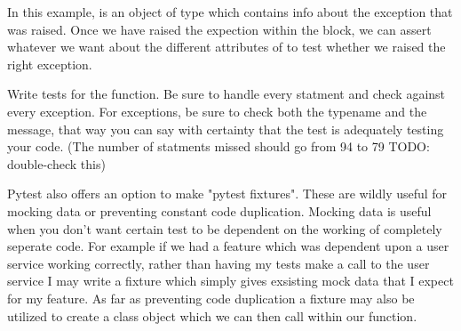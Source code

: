 In this example,  is an object of type  which contains info about the exception that was raised.  Once we have raised the expection within the  block, we can assert whatever we want about the different attributes of  to test whether we raised the right exception.

\begin{problem}
Write tests for the  function.  Be sure to handle every statment and check against every exception.
For exceptions, be sure to check both the typename and the message, that way you can say with certainty that the test is adequately testing your code.
(The number of statments missed should go from 94 to 79 TODO: double-check this)
\end{problem}

Pytest also offers an option to make "pytest fixtures". These are wildly useful for mocking data or preventing constant code duplication.
Mocking data is useful when you don't want certain test to be dependent on the working of completely seperate code.
For example if we had a feature which was dependent upon a user service working correctly, rather than having my tests make a call to the user service I may write a fixture which simply gives exsisting mock data that I expect for my feature.
As far as preventing code duplication a fixture may also be utilized to create a class object which we can then call within our function.

